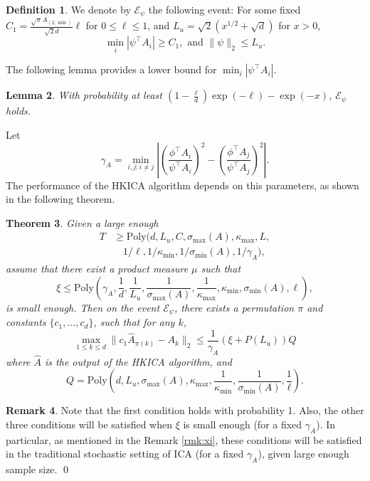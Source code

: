 \documentclass[twoside]{article}
\newcommand{\Epsi}{\mathcal{E}_{\psi}}
\newtheorem{lemma}{Lemma}[section]
\newtheorem{thm}[lemma]{Theorem}
\theoremstyle{definition}
\newtheorem{definition}[lemma]{Definition}
\newtheorem{remark}[lemma]{Remark}
\begin{document}
\begin{definition}
We denote by $\Epsi$ the following event: For some fixed $C_1 = \frac{\sqrt{\pi}A_{(2,\min)}}{\sqrt{2}d} \ell$ for $0\le \ell\le 1$, and $ L_u = \sqrt{2}\left(x^{1/2}+\sqrt{d}\right)$ for $x>0$,
\[\min_i |\psi^{\top}A_i| \ge C_1, \text{ and } \|\psi\|_2 \le L_u.\] 
\end{definition}
The following lemma provides a lower bound for $\min_i |\psi^{\top}A_i|$.
\begin{lemma}
\label{lem:dmin}
With probability at least $\left(1- \frac{\ell}{d}\right)\exp(-\ell) - \exp(-x)$, $\Epsi$ holds.
\end{lemma}
Let 
\begin{equation}
\label{def:kappa}
\gamma_A =  \min_{i,j: i\neq j} \left\vert \left(\frac{\phi^{\top}A_i}{\psi^{\top}A_i}\right)^2 - \left(\frac{\phi^{\top}A_j}{\psi^{\top}A_j}\right)^2 \right\vert. 
\end{equation}
The performance of the HKICA algorithm depends on this parameters, as shown in the following theorem.
\begin{thm}
 \label{thm:efficiency} 
Given a large enough 
\begin{align*}
T & \ge \text{Poly}(d, L_u, C, \sigma_{\max}(A),\kappa_{\max}, L,\\
& \quad  1/\ell, 1/\kappa_{\min}, 1/\sigma_{\min}(A), 1/\gamma_A),
\end{align*}
assume that there exist a product measure $\mu$ such that 
\[\xi \le \text{Poly}(\gamma_A, \frac{1}{d}, \frac{1}{L_u}, \frac{1}{\sigma_{\max}(A)}, \frac{1}{\kappa_{\max}}, \kappa_{\min}, \sigma_{\min}(A), \ell),\] 
is small enough.
 Then on the event $\Epsi$, there exists a permutation $\pi$ and constants $\{c_1,\ldots,c_d\}$, such that for any $k$,
 \[
  \max_{1\le k\le d}\| c_1\widehat{A}_{\pi(k)} - A_k\|_2 \le
  \frac{1}{\gamma_A} (\xi + P(L_u))Q
\]
where $\widehat{A}$ is the output of the HKICA algorithm, and 
\[Q=\text{Poly}(d, L_u, \sigma_{\max}(A), \kappa_{\max}, \frac{1}{\kappa_{\min}}, \frac{1}{\sigma_{\min}(A)}, \frac{1}{\ell}).\]
 \end{thm}
\begin{remark}
Note that the first condition holds with probability 1. Also, the other three conditions will be satisfied when $\xi$ is small enough (for a fixed $\gamma_A$).
In particular, as mentioned in the Remark \ref{rmk:xi}, these conditions will be satisfied in the traditional stochastic setting of ICA (for a fixed $\gamma_A$), given large enough sample size. \qed
\end{remark}
\end{document}
